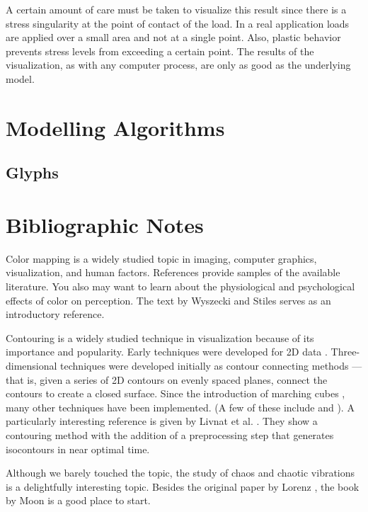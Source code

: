 A certain amount of care must be taken to visualize this result since there is a stress singularity at the point of contact of the load. In a real application loads are applied over a small area and not at a single point. Also, plastic behavior prevents stress levels from exceeding a certain point. The results of the visualization, as with any computer process, are only as good as the underlying model.

\section{Modelling Algorithms}
\subsection{Glyphs}
\label{subsec:glyphs}


\section{Bibliographic Notes}

Color mapping is a widely studied topic in imaging, computer graphics, visualization, and human factors. References \cite{Durrett87} \cite{Ware88} \cite{Rheingans92} provide samples of the available literature. You also may want to learn about the physiological and psychological effects of color on perception. The text by Wyszecki and Stiles \cite{Wyszecki82} serves as an introductory reference.

Contouring is a widely studied technique in visualization because of its importance and popularity. Early techniques were developed for 2D data \cite{Watson92}. Three-dimensional techniques were developed initially as contour connecting methods \cite{Fuchs77} --- that is, given a series of 2D contours on evenly spaced planes, connect the contours to create a closed surface. Since the introduction of marching cubes \cite{Lorensen87}, many other techniques have been implemented. (A few of these include \cite{Nielson91} \cite{Montani94} and \cite{Durst88} ). A particularly interesting reference is given by Livnat et al. \cite{Livnat96}. They show a contouring method with the addition of a preprocessing step that generates isocontours in near optimal time.

Although we barely touched the topic, the study of chaos and chaotic vibrations is a delightfully interesting topic. Besides the original paper by Lorenz \cite{Lorenz63}, the book by Moon \cite{Moon87} is a good place to start.

